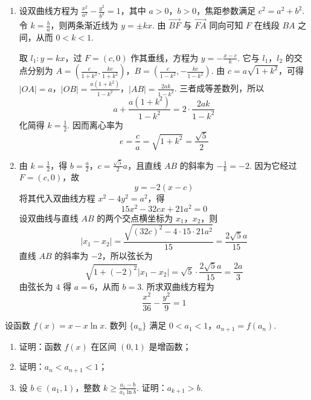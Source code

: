 \begin{solution}
\begin{enumerate}
\item 设双曲线方程为 \(\frac{x^2}{a^2}-\frac{y^2}{b^2}=1\)，其中 \(a>0\)，\(b>0\)，焦距参数满足 \(c^2=a^2+b^2\). 令 \(k=\frac{b}{a}\)，则两条渐近线为 \(y=\pm kx\). 由 \(\overrightarrow{BF}\) 与 \(\overrightarrow{FA}\) 同向可知 \(F\) 在线段 \(BA\) 之间，从而 \(0<k<1\).

取 \(l_1:y=kx\)，过 \(F=(c,0)\) 作其垂线，方程为 \(y=-\frac{x-c}{k}\). 它与 \(l_1\)，\(l_2\) 的交点分别为
\(A=\left(\frac{c}{1+k^2},\frac{kc}{1+k^2}\right)\)，\(B=\left(\frac{c}{1-k^2},-\frac{kc}{1-k^2}\right)\).
由 \(c=a\sqrt{1+k^2}\)，可得
\(|OA|=a\)，\(|OB|=\frac{a(1+k^2)}{1-k^2}\)，\(|AB|=\frac{2ak}{1-k^2}\).
三者成等差数列，所以
\[
a+\frac{a(1+k^2)}{1-k^2}=2\cdot\frac{2ak}{1-k^2}
\]
化简得 \(k=\frac{1}{2}\). 因而离心率为
\[
e=\frac{c}{a}=\sqrt{1+k^2}=\frac{\sqrt{5}}{2}
\]
\item 由 \(k=\frac{1}{2}\)，得 \(b=\frac{a}{2}\)，\(c=\frac{\sqrt{5}}{2}a\)，且直线 \(AB\) 的斜率为 \(-\frac{1}{k}=-2\). 因为它经过 \(F=(c,0)\)，故
\[
y=-2(x-c)
\]
将其代入双曲线方程 \(x^2-4y^2=a^2\)，得
\[
15x^2-32cx+21a^2=0
\]
设双曲线与直线 \(AB\) 的两个交点横坐标为 \(x_1\)，\(x_2\)，则
\[
|x_1-x_2|
=\frac{\sqrt{(32c)^2-4\cdot15\cdot21a^2}}{15}
=\frac{2\sqrt{5}a}{15}
\]
直线 \(AB\) 的斜率为 \(-2\)，所以弦长为
\[
\sqrt{1+(-2)^2}|x_1-x_2|=\sqrt{5}\cdot\frac{2\sqrt{5}a}{15}=\frac{2a}{3}
\]
由弦长为 \(4\) 得 \(a=6\)，从而 \(b=3\). 所求双曲线方程为
\[
\frac{x^2}{36}-\frac{y^2}{9}=1
\]
\end{enumerate}
\end{solution}

\begin{problem}
设函数 \( f(x) = x - x \ln x \). 数列 \( \{a_n\} \) 满足 \(0 < a_1 < 1\)，\(a_{n+1} = f(a_n)\).

\begin{enumerate}
\item 证明：函数 \( f(x) \) 在区间 \((0, 1)\) 是增函数；
\item 证明：\( a_{n}<a_{n+1}<1 \)；
\item 设 \( b \in (a_1, 1) \)，整数 \( k \geqslant \frac{a_1 - b}{a_1 \ln b} \). 证明：\( a_{k+1} > b \).
\end{enumerate}
\end{problem}

